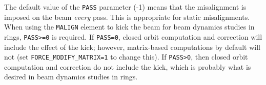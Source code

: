 The default value of the \verb|PASS| parameter (-1) means that the misalignment is
imposed on the beam {\em every} pass.  This is appropriate for static misalignments.
When using the \verb|MALIGN| element to kick the beam for beam dynamics studies in rings, \verb|PASS>=0| is
required.  If \verb|PASS=0|, closed orbit computation and correction will include the effect of
the kick; however, matrix-based computations by default will not (set \verb|FORCE_MODIFY_MATRIX=1| to
change this).  If \verb|PASS>0|, then closed orbit computation and correction do not include
the kick, which is probably what is desired in beam dynamics studies in rings.
